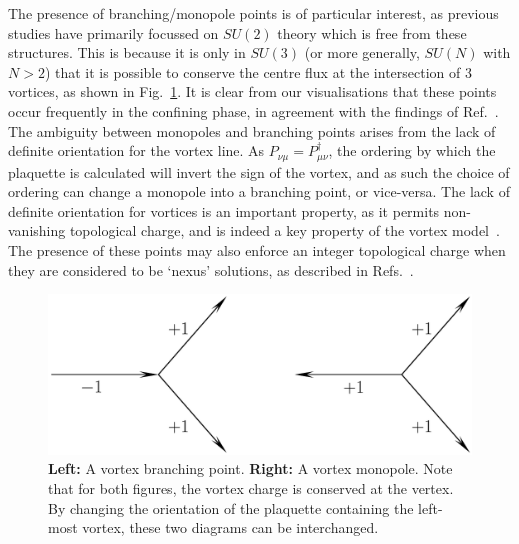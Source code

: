 The presence of branching/monopole points is of particular interest, as previous studies have primarily focussed on $SU(2)$ theory which is free from these structures. This is because it is only in $SU(3)$ (or more generally, $SU(N)$ with $N>2$) that it is possible to conserve the centre flux at the intersection of 3 vortices, as shown in Fig.~\ref{fig:VortexBranching}. It is clear from our visualisations that these points occur frequently in the confining phase, in agreement with the findings of Ref.~\cite{Spengler:2018dxt}. The ambiguity between monopoles and branching points arises from the lack of definite orientation for the vortex line. As $P_{\nu\mu} = P_{\mu\nu}^\dagger$, the ordering by which the plaquette is calculated will invert the sign of the vortex, and as such the choice of ordering can change a monopole into a branching point, or vice-versa. The lack of definite orientation for vortices is an important property, as it permits non-vanishing topological charge, and is indeed a key property of the vortex model~\cite{Engelhardt:2010ft,Engelhardt:1999xw}. The presence of these points may also enforce an integer topological charge when they are considered to be `nexus' solutions, as described in Refs.~\cite{Cornwall:1999xw,Cornwall:1998ef}.
%
\begin{figure}[htb!]
\centering
\includegraphics[width=0.6\linewidth]{./VortexBranching.pdf}
\caption[Vortex branching and monopole points]{\label{fig:VortexBranching}\textbf{Left:} A vortex branching point. \textbf{Right:} A vortex monopole. Note that for both figures, the vortex charge is conserved at the vertex. By changing the orientation of the plaquette containing the left-most vortex, these two diagrams can be interchanged.}
\end{figure}
%
